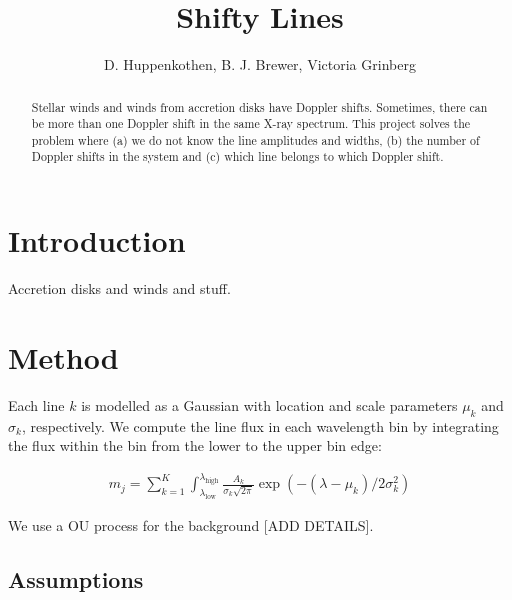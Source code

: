 \documentclass[12pt]{emulateapj}
\newcommand{\mean}{m}
\begin{document}
\title{Shifty Lines}

\author{D. Huppenkothen, B. J. Brewer, Victoria Grinberg}
 


\begin{abstract}
Stellar winds and winds from accretion disks have Doppler shifts. Sometimes, there can be more than one Doppler shift in 
the same X-ray spectrum. This project solves the problem where (a) we do not know the line amplitudes and widths, (b) the 
number of Doppler shifts in the system and (c) which line belongs to which Doppler shift.

\end{abstract}


\section{Introduction}

Accretion disks and winds and stuff.

\section{Method}

Each line $k$ is modelled as a Gaussian with location and scale parameters $\mu_k$ and $\sigma_k$, respectively. We compute the line flux in each wavelength bin by integrating the flux within the bin from the lower to the upper bin edge:

\begin{eqnarray}
\mean_j = \sum_{k=1}^{K}{\int^{\lambda_\mathrm{high}}_{\lambda_{\mathrm{low}}}{\frac{A_k}{\sigma_k\sqrt{2\pi}} \exp{(-(\lambda-\mu_k)/{2\sigma_k^2})}}}
\end{eqnarray}

We use a OU process for the background [ADD DETAILS].

 


\subsection{Assumptions}
\end{document}

